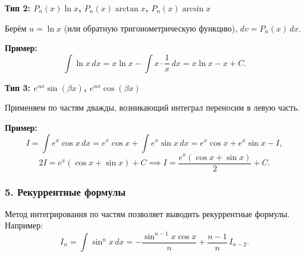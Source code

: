 \textbf{Тип 2: $P_n(x)\ln x$, $P_n(x)\arctan x$, $P_n(x)\arcsin x$}

Берём $u = \ln x$ (или обратную тригонометрическую функцию), $dv = P_n(x)\,dx$.

\textbf{Пример:}
\[
\int \ln x\,dx = x\ln x - \int x \cdot \frac{1}{x}\,dx = x\ln x - x + C.
\]

\textbf{Тип 3: $e^{\alpha x}\sin(\beta x)$, $e^{\alpha x}\cos(\beta x)$}

Применяем по частям дважды, возникающий интеграл переносим в левую часть.

\textbf{Пример:}
\[
I = \int e^x \cos x\,dx = e^x\cos x + \int e^x \sin x\,dx
  = e^x\cos x + e^x\sin x - I,
\]
\[
2I = e^x(\cos x + \sin x) + C \implies
I = \frac{e^x(\cos x + \sin x)}{2} + C.
\]

\subsubsection*{5. Рекуррентные формулы}

Метод интегрирования по частям позволяет выводить рекуррентные формулы. Например:
\[
I_n = \int \sin^n x\,dx = -\frac{\sin^{n-1}x\cos x}{n} + \frac{n-1}{n}\,I_{n-2}.
\]